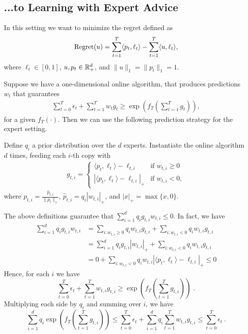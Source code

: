 \subsection{...to Learning with Expert Advice}

In this setting we want to minimize the regret defined as
\[
\operatorname{Regret}(u) = \sum_{t=1}^T \langle p_t, \ell_t \rangle - \sum_{t=1}^T \langle u, \ell_t \rangle,
\]
where $\ell_t \in [0,1]$, $u, p_t \in \mathbb{R}^d_+$, and $\|u\|_1 = \|p_t\|_1 = 1$.

Suppose we have a one-dimensional online algorithm, that produces
predictions $w_t$ that guarantees
\begin{align}
\label{eq:def_f}
\sum_{t=0}^T \epsilon_t + \sum_{t=1}^T w_t g_t \ge \exp\left(f_T\left(\sum_{t=1}^T g_t\right)\right),
\end{align}
for a given $f_T(\cdot)$. Then we can use the following prediction strategy for the expert setting.

Define $q_i$ a prior distribution over the $d$ experts. Instantiate the online algorithm
$d$ times, feeding each $i$-th copy with
\begin{align}
g_{t,i} = \begin{cases}
\langle p_t, \ell_t\rangle - \ell_{t,i} & \text{if } w_{t,i} \ge 0 \\
|\langle p_t, \ell_t\rangle - \ell_{t,i}|_+ & \text{if } w_{t,i} < 0,
\end{cases}
\end{align}
where $p_{t,i} = \frac{\hat{p}_{t,i}}{\|p_{t}\|_1}$, $\hat{p}_{t,i}=q_i |w_{t,i}|_+$, and $|x|_+=\max\{x,0\}$.

The above definitions guarantee that $\sum_{i=1}^d q_i g_{t,i} w_{t,i} \le 0$. In fact, we have
\begin{align*}
\sum_{i=1}^d q_i g_{t,i} w_{t,i}
& = \sum_{i:w_{t,i}\ge 0} q_i w_{t,i} g_{t,i} + \sum_{i:w_{t,i} < 0} q_i w_{t,i} g_{t,i} \\
& = \sum_{i=1}^d q_i g_{t,i} |w_{t,i}|_+ + \sum_{i:w_{t,i} < 0} q_i w_{t,i} g_{t,i} \\
& = 0 + \sum_{i:w_{t,i} < 0} q_i w_{t,i} |\langle p_t, \ell_t\rangle - \ell_{t,i}|_+ \le 0
\end{align*}
Hence, for each $i$ we have
\[
\sum_{t=0}^T \epsilon_t + \sum_{t=1}^T w_{t,i} g_{t,i} \geq \exp\left(f_T \left( \sum_{t=1}^T g_{t,i} \right)\right) \; .
\]
Multiplying each side by $q_i$ and summing over $i$, we have
\begin{equation}
\label{eq:bounded_potential}
\sum_{i=1}^d q_i \exp\left(f_T\left(\sum_{t=1}^T g_{t,i} \right)\right) \leq \sum_{t=0}^T \epsilon_t + \sum_{i=1}^d q_i \sum_{t=1}^T w_{t,i} g_{t,i} \le \sum_{t=0}^T \epsilon_t~.
\end{equation}

